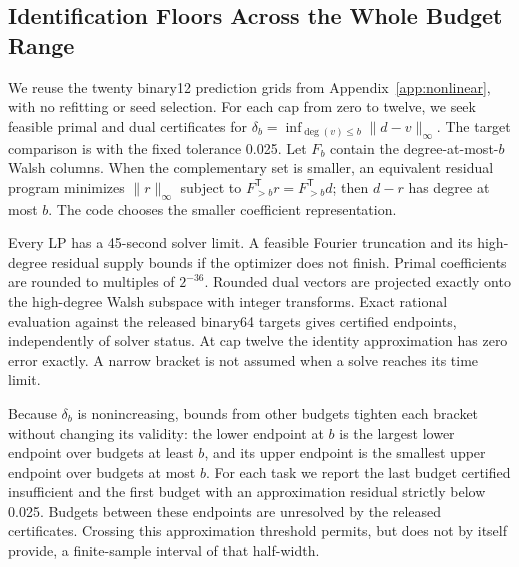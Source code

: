 

\subsection{Identification Floors Across the Whole Budget Range}\label{app:budgetcurve}
We reuse the twenty binary12 prediction grids from
Appendix~\ref{app:nonlinear}, with no refitting or seed selection.
For each cap from zero to twelve, we seek feasible primal and dual
certificates for
$\delta_b=\inf_{\deg(v)\le b}\|d-v\|_\infty$.
The target comparison is with the fixed tolerance 0.025. Let $F_b$ contain
the degree-at-most-$b$ Walsh columns. When the complementary set is
smaller, an equivalent residual program minimizes $\|r\|_\infty$ subject
to $F_{>b}^{\mathsf T}r=F_{>b}^{\mathsf T}d$; then $d-r$ has degree at
most $b$. The code chooses the smaller coefficient representation.

Every LP has a 45-second solver limit. A feasible Fourier truncation and
its high-degree residual supply bounds if the optimizer does not finish.
Primal coefficients are rounded to multiples of $2^{-36}$. Rounded dual
vectors are projected exactly onto the high-degree Walsh subspace with
integer transforms. Exact rational evaluation against the released
binary64 targets gives certified endpoints, independently of solver status.
At cap twelve the identity approximation has zero error exactly. A narrow
bracket is not assumed when a solve reaches its time limit.

Because $\delta_b$ is nonincreasing, bounds from other budgets tighten
each bracket without changing its validity: the lower endpoint at $b$ is
the largest lower endpoint over budgets at least $b$, and its upper
endpoint is the smallest upper endpoint over budgets at most $b$.
For each task we report the last budget certified insufficient and the
first budget with an approximation residual strictly below 0.025.
Budgets between these endpoints are unresolved by the released
certificates. Crossing this approximation threshold permits, but does
not by itself provide, a finite-sample interval of that half-width.


